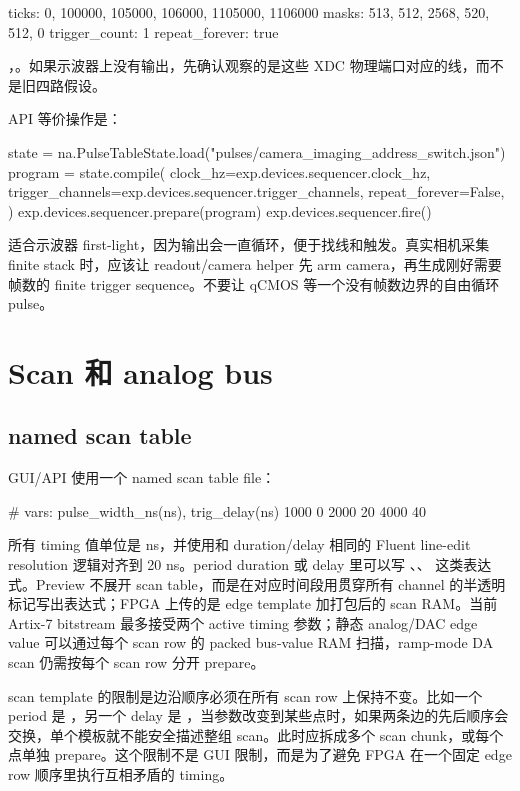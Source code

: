 \documentclass[11pt,oneside,openany]{book}
\begin{document}
\begin{codeblock}
ticks: 0, 100000, 105000, 106000, 1105000, 1106000
masks: 513, 512, 2568, 520, 512, 0
trigger_count: 1
repeat_forever: true
\end{codeblock}

，。如果示波器上没有输出，先确认观察的是这些 XDC 物理端口对应的线，而不是旧四路假设。

API 等价操作是：

\begin{codeblock}[Python]
state = na.PulseTableState.load("pulses/camera_imaging_address_switch.json")
program = state.compile(
    clock_hz=exp.devices.sequencer.clock_hz,
    trigger_channels=exp.devices.sequencer.trigger_channels,
    repeat_forever=False,
)
exp.devices.sequencer.prepare(program)
exp.devices.sequencer.fire()
\end{codeblock}

 适合示波器 first-light，因为输出会一直循环，便于找线和触发。真实相机采集 finite stack 时，应该让 readout/camera helper 先 arm camera，再生成刚好需要帧数的 finite trigger sequence。不要让 qCMOS 等一个没有帧数边界的自由循环 pulse。

\chapter{Scan 和 analog bus}
\section{named scan table}
GUI/API 使用一个 named scan table file：

\begin{codeblock}
# vars: pulse_width_ns(ns), trig_delay(ns)
1000 0
2000 20
4000 40
\end{codeblock}

所有 timing 值单位是 ns，并使用和 duration/delay 相同的 Fluent line-edit resolution 逻辑对齐到 20 ns。period duration 或 delay 里可以写 、、 这类表达式。Preview 不展开 scan table，而是在对应时间段用贯穿所有 channel 的半透明标记写出表达式；FPGA 上传的是 edge template 加打包后的 scan RAM。当前 Artix-7 bitstream 最多接受两个 active timing 参数；静态 analog/DAC edge value 可以通过每个 scan row 的 packed bus-value RAM 扫描，ramp-mode DA scan 仍需按每个 scan row 分开 prepare。

scan template 的限制是边沿顺序必须在所有 scan row 上保持不变。比如一个 period 是 ，另一个 delay 是 ，当参数改变到某些点时，如果两条边的先后顺序会交换，单个模板就不能安全描述整组 scan。此时应拆成多个 scan chunk，或每个点单独 prepare。这个限制不是 GUI 限制，而是为了避免 FPGA 在一个固定 edge row 顺序里执行互相矛盾的 timing。
\end{document}
